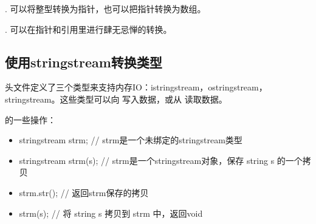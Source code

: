 \documentclass[letterpaper,10pt,english]{sphinxmanual}
\begin{document}
.  可以将整型转换为指针，也可以把指针转换为数组。

.  可以在指针和引用里进行肆无忌惮的转换。


\subsection{使用stringstream转换类型}
\label{\detokenize{cpp/10_cast:stringstream}}
%
\begin{sphinxVerbatim}[commandchars=\\\{\}]
 
\end{sphinxVerbatim}

 头文件定义了三个类型来支持内存IO：istringstream，ostringstream，stringstream。这些类型可以向  写入数据，或从  读取数据。

 的一些操作：
\begin{itemize}
\item {} 
stringstream strm; // strm是一个未绑定的stringstream类型

\item {} 
stringstream strm(s); // strm是一个stringstream对象，保存 string s 的一个拷贝

\item {} 
strm.str(); // 返回strm保存的拷贝

\item {} 
strm(s); // 将 string s 拷贝到 strm 中，返回void

\end{itemize}
\end{document}

